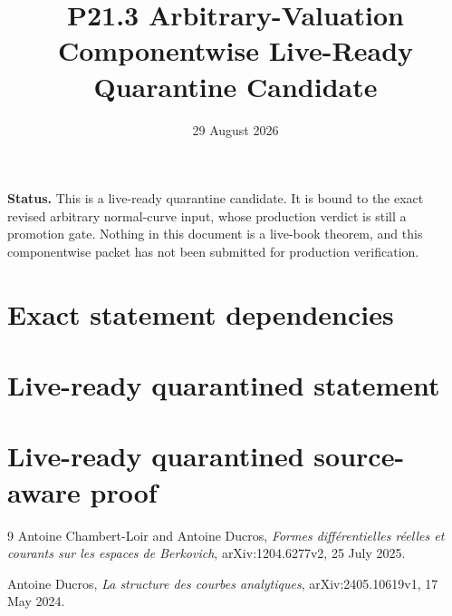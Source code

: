 \documentclass[11pt]{article}
\title{P21.3 Arbitrary-Valuation Componentwise Live-Ready Quarantine Candidate}
\author{}
\date{29 August 2026}
\theoremstyle{remark}
\begin{document}
\maketitle

\noindent\textbf{Status.}
This is a live-ready quarantine candidate.  It is bound to the exact revised
arbitrary normal-curve input, whose production verdict is still a promotion
gate.  Nothing in this document is a live-book theorem, and this componentwise
packet has not been submitted for production verification.

\section*{Exact statement dependencies}







\section*{Live-ready quarantined statement}



\section*{Live-ready quarantined source-aware proof}



\begin{thebibliography}{9}
Antoine Chambert-Loir and Antoine Ducros,
\emph{Formes diff\'erentielles r\'eelles et courants sur les espaces de
Berkovich}, arXiv:1204.6277v2, 25 July 2025.

Antoine Ducros,
\emph{La structure des courbes analytiques},
arXiv:\allowbreak 2405.10619v1, 17 May 2024.
\end{thebibliography}
\end{document}
